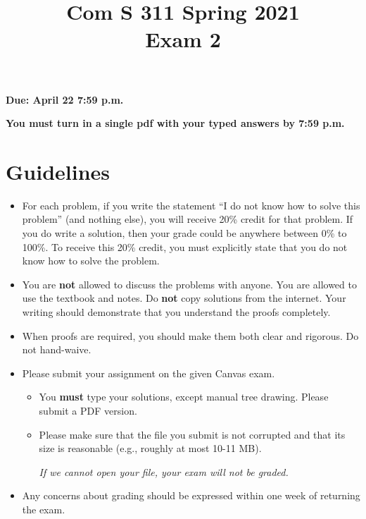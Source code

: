 \documentclass[11pt]{amsart}
\begin{document}


\title{
Com S 311 Spring 2021\\
Exam 2
}

\maketitle


\vspace{-.8cm}
\begin{center}
{\bf Due:  April 22 7:59 p.m.}

\smallskip
\textbf{You must turn in a single pdf with your typed answers by 7:59 p.m.}
\end{center}

\medskip

\section*{Guidelines}


\begin{itemize}

\item %
For each problem, if you write  the statement ``I do not know how to solve this problem'' (and nothing else), you will receive 20\% credit for that problem. If you do write a solution, then your grade could be anywhere between 0\% to 100\%.
To receive this 20\% credit, you must explicitly state that you do not know how to solve the problem.

\item You are \textbf{not} allowed to discuss the problems with anyone. You are allowed to use the textbook and notes. Do \textbf{not} copy solutions from the internet. Your writing should demonstrate that you understand the proofs completely.

\item When proofs are required, you should make them both clear and rigorous. Do not hand-waive.

 \item Please submit your assignment on the given Canvas exam.
 \begin{itemize}
\item  You \textbf{must} type your solutions, except manual tree drawing. Please submit a PDF version.
\item Please make sure that the file you submit is not corrupted and that its size is reasonable (e.g., roughly at most 10-11 MB).
\begin{center}
\emph{If we cannot open your file, your exam will not be graded.}
\end{center}
\end{itemize}

\item Any concerns about grading should be expressed within one week of
returning the exam. 
 
\end{itemize}
\end{document}
